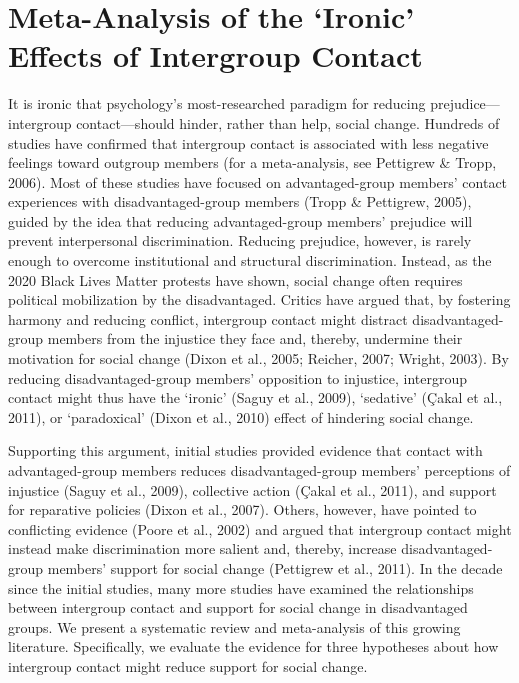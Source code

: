 \documentclass[12pt, letterpaper]{article}
\begin{document}
\newpage

\section{Meta-Analysis of the `Ironic' Effects of Intergroup Contact}

It is ironic that psychology's most-researched paradigm for reducing
prejudice---intergroup contact---should hinder, rather than help, social
change. Hundreds of studies have confirmed that intergroup contact is
associated with less negative feelings toward outgroup members (for a
meta-analysis, see Pettigrew \& Tropp, 2006). Most of these studies have
focused on advantaged-group members' contact experiences with
disadvantaged-group members (Tropp \& Pettigrew, 2005), guided by the
idea that reducing advantaged-group members' prejudice will prevent
interpersonal discrimination. Reducing prejudice, however, is rarely
enough to overcome institutional and structural discrimination. Instead,
as the 2020 Black Lives Matter protests have shown, social change often
requires political mobilization by the disadvantaged. Critics have
argued that, by fostering harmony and reducing conflict, intergroup
contact might distract disadvantaged-group members from the injustice
they face and, thereby, undermine their motivation for social change
(Dixon et al., 2005; Reicher, 2007; Wright, 2003). By reducing
disadvantaged-group members' opposition to injustice, intergroup contact
might thus have the `ironic' (Saguy et al., 2009), `sedative' (Çakal et
al., 2011), or `paradoxical' (Dixon et al., 2010) effect of hindering
social change.

Supporting this argument, initial studies provided evidence that contact
with advantaged-group members reduces disadvantaged-group members'
perceptions of injustice (Saguy et al., 2009), collective action (Çakal
et al., 2011), and support for reparative policies (Dixon et al., 2007).
Others, however, have pointed to conflicting evidence (Poore et al.,
2002) and argued that intergroup contact might instead make
discrimination more salient and, thereby, increase disadvantaged-group
members' support for social change (Pettigrew et al., 2011). In the
decade since the initial studies, many more studies have examined the
relationships between intergroup contact and support for social change
in disadvantaged groups. We present a systematic review and
meta-analysis of this growing literature. Specifically, we evaluate the
evidence for three hypotheses about how intergroup contact might reduce
support for social change.
\end{document}
